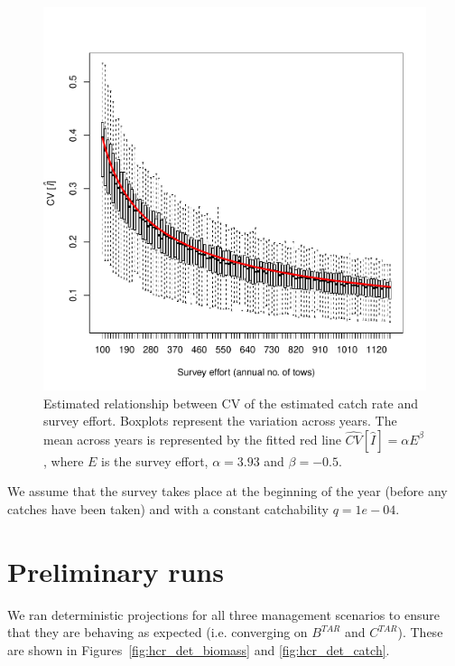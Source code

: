 \documentclass[a4paper]{article}
\begin{document}
\begin{figure}
\centering
\includegraphics{../dat/effCV.pdf}
\caption{Estimated relationship between CV of the estimated catch rate and survey effort. Boxplots represent the variation across years. 
The mean across years is represented by the fitted red line $\hat{CV}[\hat{I}] = \alpha E ^ \beta$, where $E$ is the survey effort,
$\alpha=3.93$ and $\beta = -0.5$.}
\label{fig:effCV}
\end{figure} 

We assume that the survey takes place at the beginning of the year (before any catches have been taken)
and with a constant catchability $q=1e-04$. 

\section{Preliminary runs}

We ran deterministic projections for all three management scenarios to ensure that they are behaving as expected (i.e. converging on $B^{TAR}$ and $C^{TAR}$).
These are shown in Figures~\ref{fig:hcr_det_biomass} and \ref{fig:hcr_det_catch}.
\end{document}
